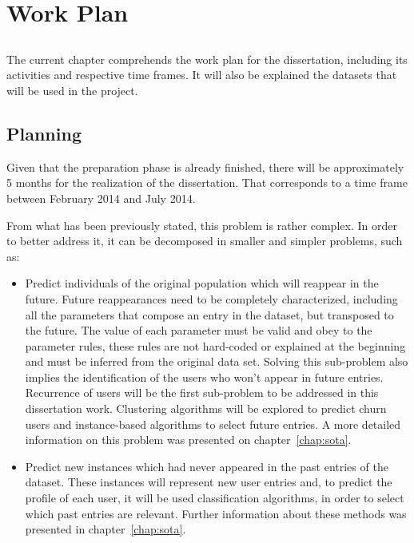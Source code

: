 \chapter{Work Plan}\label{chap:chap3}

\section*{}

The current chapter comprehends the work plan for the dissertation, including its activities and respective time frames.
It will also be explained the datasets that will be used in the project.

\section{Planning}

Given that the preparation phase is already finished, there will be approximately 5 months for the realization of the dissertation.
That corresponds to a time frame between February 2014 and July 2014.

From what has been previously stated, this problem is rather complex. In order to better
address it, it can be decomposed in smaller and simpler problems, such as:
\begin{itemize}
    \item Predict individuals of the original population which will reappear in the future. Future reappearances need to be completely characterized, including 
      all the parameters that compose an entry in the dataset, but transposed to the future. The value of each parameter must be valid and obey to the parameter
      rules, these rules are not hard-coded or explained at the beginning and must be inferred from the original data set. Solving this sub-problem also implies the identification
      of the users who won't appear in future entries. Recurrence of users will be the first sub-problem to be addressed in this dissertation work. 
      Clustering algorithms will be explored to predict churn users and instance-based algorithms to select future entries. A more detailed information
      on this problem was presented on chapter~\ref{chap:sota}.
    \item Predict new instances which had never appeared in the past entries of the dataset.
      These instances will represent new user entries and, to predict the profile of each user, it will be used classification algorithms, in order to select 
      which past entries are relevant. Further information about these methods
      was presented in
      chapter~\ref{chap:sota}.
\end{itemize}

